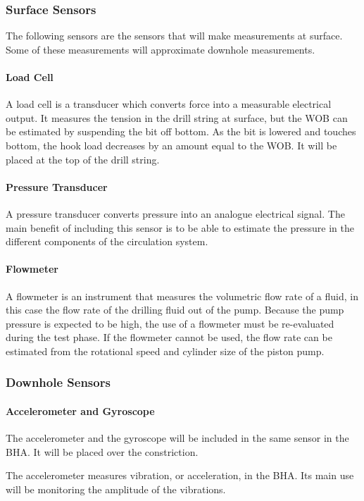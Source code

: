 \subsubsection{Surface Sensors}
The following sensors are the sensors that will make measurements at surface. Some of these measurements will approximate downhole measurements.

\paragraph{Load Cell}
A load cell is a transducer which converts force into a measurable electrical output. It measures the tension in the drill string at surface, but the WOB can be estimated by suspending the bit off bottom. As the bit is lowered and touches bottom, the hook load decreases by an amount equal to the WOB. It will be placed at the top of the drill string.

\paragraph{Pressure Transducer}
A pressure transducer converts pressure into an analogue electrical signal. The main benefit of including this sensor is to be able to estimate the pressure in the different components of the circulation system.

\paragraph{Flowmeter}
A flowmeter is an instrument that measures the volumetric flow rate of a fluid, in this case the flow rate of the drilling fluid out of the pump. Because the pump pressure is expected to be high, the use of a flowmeter must be re-evaluated during the test phase. If the flowmeter cannot be used, the flow rate can be estimated from the rotational speed and cylinder size of the piston pump.

\subsubsection{Downhole Sensors}
\paragraph{Accelerometer and Gyroscope}
The accelerometer and the gyroscope will be included in the same sensor in the BHA. It will be placed over the constriction.

The accelerometer measures vibration, or acceleration, in the BHA. Its main use will be monitoring the amplitude of the vibrations.

